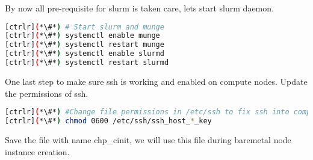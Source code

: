 By now all pre-requisite for slurm is taken care, lets start slurm daemon.


\begin{lstlisting}[language=bash,keywords={}]
[ctrlr](*\#*) # Start slurm and munge 
[ctrlr](*\#*) systemctl enable munge
[ctrlr](*\#*) systemctl restart munge
[ctrlr](*\#*) systemctl enable slurmd
[ctrlr](*\#*) systemctl restart slurmd
\end{lstlisting}

One last step to make sure ssh is working and enabled on compute nodes. Update the permissions 
of ssh.


\begin{lstlisting}[language=bash,keywords={}]
[ctrlr](*\#*) #Change file permissions in /etc/ssh to fix ssh into compute node
[ctrlr](*\#*) chmod 0600 /etc/ssh/ssh_host_*_key
\end{lstlisting}

Save the file with name chp\_cinit, we will use this file during baremetal node instance creation.

